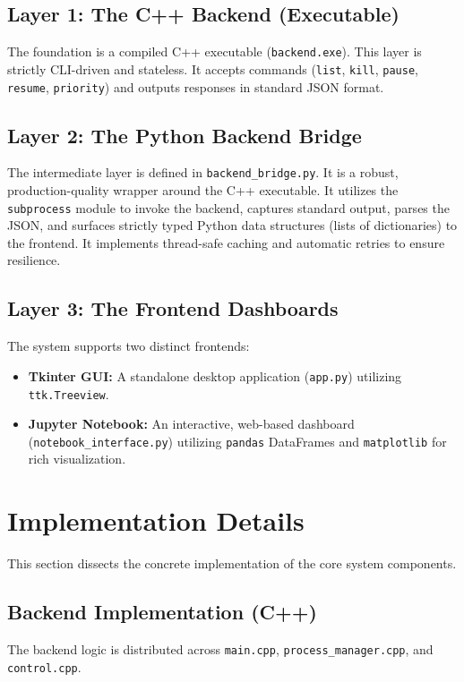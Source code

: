 \documentclass{article}
\begin{document}
\subsection{Layer 1: The C++ Backend (Executable)}
The foundation is a compiled C++ executable (\texttt{backend.exe}). This layer is strictly CLI-driven and stateless. It accepts commands (\texttt{list}, \texttt{kill}, \texttt{pause}, \texttt{resume}, \texttt{priority}) and outputs responses in standard JSON format. 

\subsection{Layer 2: The Python Backend Bridge}
The intermediate layer is defined in \texttt{backend\_bridge.py}. It is a robust, production-quality wrapper around the C++ executable. It utilizes the \texttt{subprocess} module to invoke the backend, captures standard output, parses the JSON, and surfaces strictly typed Python data structures (lists of dictionaries) to the frontend. It implements thread-safe caching and automatic retries to ensure resilience.

\subsection{Layer 3: The Frontend Dashboards}
The system supports two distinct frontends:
\begin{itemize}
    \item \textbf{Tkinter GUI:} A standalone desktop application (\texttt{app.py}) utilizing \texttt{ttk.Treeview}.
    \item \textbf{Jupyter Notebook:} An interactive, web-based dashboard (\texttt{notebook\_interface.py}) utilizing \texttt{pandas} DataFrames and \texttt{matplotlib} for rich visualization.
\end{itemize}

\section{Implementation Details}
This section dissects the concrete implementation of the core system components.

\subsection{Backend Implementation (C++)}
The backend logic is distributed across \texttt{main.cpp}, \texttt{process\_manager.cpp}, and \texttt{control.cpp}.
\end{document}
